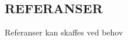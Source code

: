 \documentclass[margin, 10pt, norsk]{res} %
\begin{document}
\begin{resume}

\hspace{5mm} 

\section{REFERANSER} 
Referanser kan skaffes ved behov




\end{resume}
\end{document}
